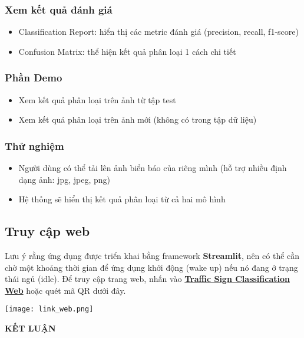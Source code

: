\documentclass[a4paper,12pt]{article}
\begin{document}
\subsubsection{Xem kết quả đánh giá}
\begin{itemize}
    \item Classification Report: hiển thị các metric đánh giá (precision, recall, f1-score)
    \item Confusion Matrix: thể hiện kết quả phân loại 1 cách chi tiết
\end{itemize}

\subsubsection{Phần Demo}
\begin{itemize}
    \item Xem kết quả phân loại trên ảnh từ tập test
    \item Xem kết quả phân loại trên ảnh mới (không có trong tập dữ liệu)
\end{itemize}

\subsubsection{Thử nghiệm}
\begin{itemize}
    \item Người dùng có thể tải lên ảnh biển báo của riêng mình (hỗ trợ nhiều định dạng ảnh: jpg, jpeg, png)
    \item Hệ thống sẽ hiển thị kết quả phân loại từ cả hai mô hình
\end{itemize}

\subsection{Truy cập web}
\hspace{5mm}Lưu ý rằng ứng dụng được triển khai bằng framework \textbf{Streamlit}, nên có thể cần chờ một khoảng thời gian để ứng dụng khởi động (wake up) nếu nó đang ở trạng thái ngủ (idle). Để truy cập trang web, nhấn vào \href{https://traffic-sign-classification-through-images.streamlit.app/}{\textbf{Traffic Sign Classification Web}} hoặc quét mã QR dưới đây.
\begin{center}
    \texttt{[image: link\_web.png]}
\end{center}

\newpage
{}
\thispagestyle{empty}
\begin{center}
    \textbf{\large KẾT LUẬN}
\end{center}
\vspace{1cm}
\end{document}
